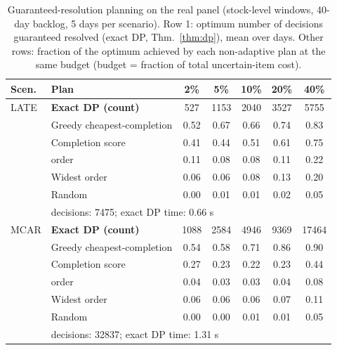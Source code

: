 \begin{table}[t]\centering\caption{Guaranteed-resolution planning on the real panel (stock-level windows, 40-day backlog, 5 days per scenario). Row 1: optimum number of decisions guaranteed resolved (exact DP, Thm.~\ref{thm:dp}), mean over days. Other rows: fraction of the optimum achieved by each non-adaptive plan at the same budget (budget = fraction of total uncertain-item cost).}\label{tab:wc}
\scriptsize\setlength{\tabcolsep}{2.2pt}\begin{tabular}{llccccc}\toprule
Scen. & Plan & 2\% & 5\% & 10\% & 20\% & 40\%\\
\midrule
LATE & \textbf{Exact DP (count)} & 527 & 1153 & 2040 & 3527 & 5755\\
 & Greedy cheapest-completion & 0.52 & 0.67 & 0.66 & 0.74 & 0.83\\
 & Completion score & 0.41 & 0.44 & 0.51 & 0.61 & 0.75\\
 & \seaq{} order & 0.11 & 0.08 & 0.08 & 0.11 & 0.22\\
 & Widest order & 0.06 & 0.06 & 0.08 & 0.13 & 0.20\\
 & Random & 0.00 & 0.01 & 0.01 & 0.02 & 0.05\\
 & \multicolumn{6}{l}{decisions: 7475; exact DP time: 0.66 s}\\
\midrule
MCAR & \textbf{Exact DP (count)} & 1088 & 2584 & 4946 & 9369 & 17464\\
 & Greedy cheapest-completion & 0.54 & 0.58 & 0.71 & 0.86 & 0.90\\
 & Completion score & 0.27 & 0.23 & 0.22 & 0.23 & 0.44\\
 & \seaq{} order & 0.04 & 0.03 & 0.03 & 0.04 & 0.08\\
 & Widest order & 0.06 & 0.06 & 0.06 & 0.07 & 0.11\\
 & Random & 0.00 & 0.00 & 0.01 & 0.01 & 0.05\\
 & \multicolumn{6}{l}{decisions: 32837; exact DP time: 1.31 s}\\
\bottomrule\end{tabular}\end{table}
